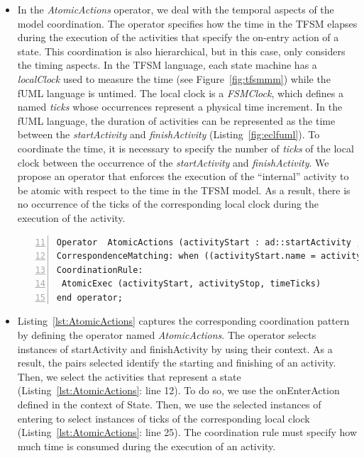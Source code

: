 \begin{itemize}
		
		
		\item In the \emph{AtomicActions} operator, we deal with the temporal aspects of the model coordination. The operator specifies how the time in the TFSM elapses during the execution of the activities that specify the on-entry action of a state. This coordination is also hierarchical, but in this case, only considers the timing aspects. In the TFSM language, each state machine has a \emph{localClock} used to measure the time (see Figure~\ref{fig:tfsmmm}) while the fUML language is untimed. The local clock is a \emph{FSMClock}, which defines a \dse named \emph{ticks} whose occurrences represent a physical time increment. In the fUML language, the duration of activities can be represented as the time between the \dse \emph{startActivity} and \dse \emph{finishActivity} (Listing~\ref{fig:eclfuml}). To coordinate the time, it is necessary to specify the number of \emph{ticks} of the local clock between the occurrence of the \dse \emph{startActivity} and \emph{finishActivity}. We propose an operator that enforces the execution of the ``internal'' activity to be atomic with respect to the time in the TFSM model. As a result, there is no occurrence of the \dse ticks of the corresponding local clock during the execution of the activity.
		
		
\begin{lstlisting}[language=bcool,
caption={Timing coordination operator between TFSM and fUML language},
label={lst:AtomicActions}, 
basicstyle=\scriptsize\ttfamily, backgroundcolor=\color{LGrey}, numbers=left, xleftmargin=2pt, firstnumber=11]
Operator  AtomicActions (activityStart : ad::startActivity , activityStop : ad::finishActivity, enterState : tfsm::entering, leaveState : tfsm::leaving, timeTicks : tfsm::ticks)
CorrespondenceMatching: when ((activityStart.name = activityStop.name ) and (activityStart.name = enterState.OnEnterAction.name ) and (enterState.owningFSM.localClock = timeTicks));
CoordinationRule: 
 AtomicExec (activityStart, activityStop, timeTicks)
end operator;
\end{lstlisting}
		
		\item Listing~\ref{lst:AtomicActions} captures the corresponding coordination pattern by defining the operator named \emph{AtomicActions}. The operator selects instances of \dse startActivity and finishActivity by using their context. As a result, the pairs selected identify the starting and finishing of an activity. Then, we select the activities that represent a state (Listing~\ref{lst:AtomicActions}: line 12). To do so, we use the onEnterAction defined in the context of State. Then, we use the selected instances of \dse entering to select instances of \dse ticks of the corresponding local clock (Listing~\ref{lst:AtomicActions}: line 25). The coordination rule must specify how much time is consumed during the execution of an activity.
		

\end{itemize}
